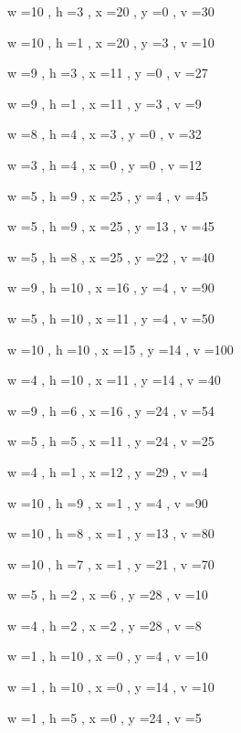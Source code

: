 \documentclass[11pt]{article}
\begin{document}
w =10 , h =3 , x =20 , y =0 , v =30
\par
w =10 , h =1 , x =20 , y =3 , v =10
\par
w =9 , h =3 , x =11 , y =0 , v =27
\par
w =9 , h =1 , x =11 , y =3 , v =9
\par
w =8 , h =4 , x =3 , y =0 , v =32
\par
w =3 , h =4 , x =0 , y =0 , v =12
\par
w =5 , h =9 , x =25 , y =4 , v =45
\par
w =5 , h =9 , x =25 , y =13 , v =45
\par
w =5 , h =8 , x =25 , y =22 , v =40
\par
w =9 , h =10 , x =16 , y =4 , v =90
\par
w =5 , h =10 , x =11 , y =4 , v =50
\par
w =10 , h =10 , x =15 , y =14 , v =100
\par
w =4 , h =10 , x =11 , y =14 , v =40
\par
w =9 , h =6 , x =16 , y =24 , v =54
\par
w =5 , h =5 , x =11 , y =24 , v =25
\par
w =4 , h =1 , x =12 , y =29 , v =4
\par
w =10 , h =9 , x =1 , y =4 , v =90
\par
w =10 , h =8 , x =1 , y =13 , v =80
\par
w =10 , h =7 , x =1 , y =21 , v =70
\par
w =5 , h =2 , x =6 , y =28 , v =10
\par
w =4 , h =2 , x =2 , y =28 , v =8
\par
w =1 , h =10 , x =0 , y =4 , v =10
\par
w =1 , h =10 , x =0 , y =14 , v =10
\par
w =1 , h =5 , x =0 , y =24 , v =5
\par
\newpage


\end{document}
